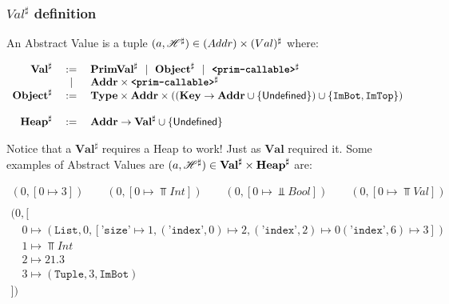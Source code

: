 \subsubsection*{\(Val^\sharp\) definition}

An Abstract Value is a tuple
\((a, \mathscr{H}^\sharp) \in \mathbf(Addr) \times \mathbf(Val)^\sharp\) where:

\vspace*{-1em}
$$\begin{array}{rcl}
  \mathbf{Val}^\sharp &:=& \mathbf{PrimVal}^\sharp ~~|~~ \mathbf{Object}^\sharp ~~|~~
  \textbf{\texttt{<prim-callable>}}^\sharp \\
         &~~|~~& \mathbf{Addr} \times \textbf{\texttt{<prim-callable>}}^\sharp \\
  \mathbf{Object}^\sharp &:=& \mathbf{Type} \times \mathbf{Addr} \times \left(\left(\mathbf{Key} \to \mathbf{Addr} \cup \{\mathsf{Undefined}\}\right) \cup \left\{\texttt{ImBot}, \texttt{ImTop}\right\}\right) \\
  \\
  \mathbf{Heap}^\sharp  &:=& \mathbf{Addr} \to \mathbf{Val}^\sharp \cup \{\mathsf{Undefined}\} \\
\end{array}$$

%

Notice that a \(\mathbf{Val}^\sharp\) requires a Heap to work! Just as
\(\mathbf{Val}\) required it. Some examples of Abstract Values are
\((a, \mathscr{H}^\sharp) \in \mathbf{Val}^\sharp \times \mathbf{Heap}^\sharp\) are:

\[\begin{array}{l}
    (0, [0 \mapsto 3]) \qquad (0, [0 \mapsto \Top{Int}]) \qquad
    (0, [0 \mapsto \Bot{Bool}]) \qquad (0, [0 \mapsto \Top{Val}]) \\
    \\
    (0, [\\
    \quad 0 \mapsto (\texttt{List}, 0,
              [\texttt{'size'} \mapsto 1,
              \left(\texttt{'index'}, 0\right) \mapsto 2,
              \left(\texttt{'index'}, 2\right) \mapsto 0
              \left(\texttt{'index'}, 6\right) \mapsto 3
          ]) \\
    \quad 1 \mapsto \Top{Int} \\
    \quad 2 \mapsto 21.3 \\
    \quad 3 \mapsto (\texttt{Tuple}, 3, \texttt{ImBot}) \\
    ]) \\
\end{array}\]

